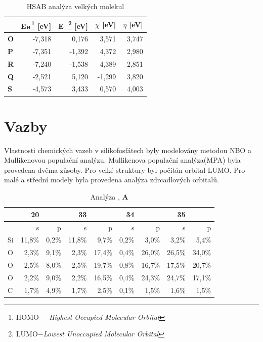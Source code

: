\documentclass[
  digital, %
  table,   %
  lof,     %
  lot,     %
  oneside,
]{fithesis3}
\renewcommand{\thesubfigure}{}
\begin{document}
\begin{table}[htbp]
\begin{minipage}{\textwidth}

\caption{HSAB analýza velkých molekul}
\begin{center}
\begin{tabular}{|l|r|r|r|r|}
\hline
\label{hsab_large} & E$_{\ce{H}}$\footnote{HOMO $-$ \textit{Highest Occupied Molecular Orbital}} [eV] & E$_{\ce{L}}$\footnote{LUMO$ - $\textit{Lowest Unoccupied Molecular Orbital}} [eV]& $\chi$ [eV] & $\eta$ [eV] \\ \hline
\textbf{O} & -7,318 & 0,176 & 3,571 & 3,747 \\ \hline
\textbf{P} & -7,351 & -1,392 & 4,372 & 2,980 \\ \hline
\textbf{R} & -7,240 & -1,538 & 4,389 & 2,851 \\ \hline
\textbf{Q} & -2,521 & 5,120 & -1,299 & 3,820 \\ \hline
\textbf{S} & -4,573 & 3,433 & 0,570 & 4,003 \\ \hline
\end{tabular}
\end{center}
\end{minipage}
\end{table}





\section{Vazby}
\renewcommand{\thesubfigure}{(\alph{subfigure})}
Vlastnosti chemických vazeb v silikofosfátech byly modelovány metodou NBO a Mullikenovou populační analýzu. Mullikenova populační analýza(MPA) byla provedena dvěma zůsoby. Pro velké struktury byl počítán orbital LUMO. Pro malé a střední modely byla provedena analýza zdrcadlových orbitalů. \\


\begin{table}[htbp]
\caption{Analýza , \textbf{A}}
\begin{center}
\begin{tabular}{|l|r|r|r|r|r|r|r|r|}
\hline
 & 20 & \multicolumn{1}{l|}{} & 33 & \multicolumn{1}{l|}{} & 34 & \multicolumn{1}{l|}{} & 35 & \multicolumn{1}{l|}{} \\ \hline
  & s & p & s & p & s & p & s & p \\ \hline
Si & 11,8\% & 0,2\% & 11,8\% & 9,7\% & 0,2\% & 3,0\% & 3,2\% & 5,4\% \\ \hline
O & 2,3\% & 9,1\% & 2,3\% & 17,4\% & 0,4\% & 26,0\% & 26,5\% & 34,0\% \\ \hline
O & 2,5\% & 8,0\% & 2,5\% & 19,7\% & 0,8\% & 16,7\% & 17,5\% & 20,7\% \\ \hline
O & 2,2\% & 9,0\% & 2,2\% & 16,5\% & 0,4\% & 24,3\% & 24,7\% & 17,1\% \\ \hline
C & 1,7\% & 4,9\% & 1,7\% & 2,5\% & 0,1\% & 1,5\% & 1,6\% & 1,5\% \\ \hline
\end{tabular}
\end{center}
\label{si_ch3_och3_MPA}
\end{table}
\end{document}
